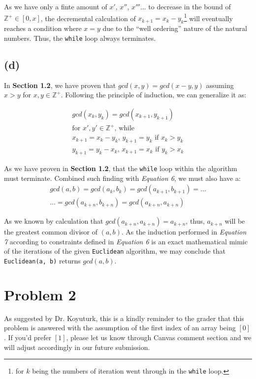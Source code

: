 \documentclass[12pt]{article}
\newcommand{\inlinecode}{\texttt}
\begin{document}
As we have only a finte amount of $x'$, $x''$, $x'''$... to decrease in the bound of $\mathbb{Z^+} \in [0, x]$, the decremental calculation of $x_{k+1} = x_{k} - y_{k}$\footnote{for $k$ being the numbers of iteration went through in the \inlinecode{while} loop.} will eventually reaches a condition where $x = y$ due to the ``well ordering'' nature of the natural numbers. Thus, the \inlinecode{while} loop always terminates.

\subsection{(d)}

In \textbf{Section 1.2}, we have proven that $gcd(x, y) = gcd(x-y, y)$ assuming $x > y$ for $x, y \in \mathbb{Z^+}$. Following the principle of induction, we can generalize it as:

\begin{gather}
    gcd(x_k, y_k) = gcd(x_{k+1}, y_{k+1}) \\
    \text{for $x', y' \in \mathbb{Z^+}$,  while } \nonumber \\
    \text{$x_{k+1} = x_{k} - y_{k}$, $y_{k+1} = y_{k}$ \ \ \  if $x_{k} > y_{k}$} \nonumber \\
    \text{$y_{k+1} = y_{k} - x_{k}$, $x_{k+1} = x_{k}$ \ \ \  if $y_{k} > x_{k}$} \nonumber
\end{gather}



As we have proven in \textbf{Section 1.2}, that the \inlinecode{while} loop within the algorithm must terminate. Combined such finding with \textit{Equation 6}, we must also have a:
\begin{gather}
    gcd(a, b) = gcd(a_{k}, b_{k}) = gcd(a_{k+1}, b_{k+1}) = ... \\ ... = gcd(a_{k+n}, b_{k+n}) = gcd(a_{k+n}, a_{k+n}) \nonumber
\end{gather}

As we known by calculation that $gcd(a_{k+n}, a_{k+n}) = a_{k+n}$, thus, $a_{k+n}$ will be the greatest common divisor of $(a, b)$. As the induction performed in \textit{Equation 7} according to constraints defined in \textit{Equation 6} is an exact mathematical mimic of the iterations of the given \inlinecode{Euclidean} algorithm, we may conclude that \inlinecode{Euclidean(a, b)} returns $gcd(a, b)$.

\section{Problem 2}
As suggested by Dr. Koyuturk, this is a kindly reminder to the grader that this problem is answered with the assumption of the first index of an array being $[0]$. If you'd prefer $[1]$, please let us know through Canvas comment section and we will adjust accordingly in our future submission.
\end{document}
